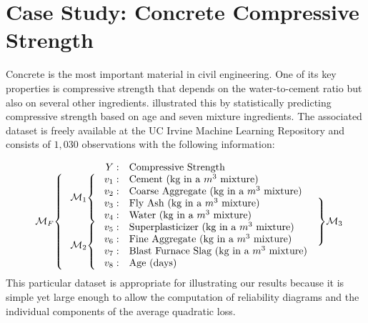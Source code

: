 \documentclass[11pt]{article}
\theoremstyle{definition}
\theoremstyle{definition}
\begin{document}
\section{Case Study: Concrete Compressive Strength} \label{application}

Concrete is the most important material in civil engineering. One of its key properties is compressive strength that depends on the water-to-cement ratio but also on several other ingredients. \cite{yeh1998modeling} illustrated this by statistically predicting compressive strength based on age and seven mixture ingredients. The associated dataset is freely available at the UC Irvine Machine Learning Repository \citep{Lichman:2013} and consists of $1,030$ observations with the following information:

\begin{equation}
\begin{array}{ll r lr}
&&Y: & \text{Compressive Strength}&\\
\ldelim\{{8}{2.5em}[$\mathcal{M}_F$] &\ldelim\{{4}{2.5em}[$\mathcal{M}_1$] &v_1: &  \text{Cement (kg in a $m^3$ mixture)}&  \\
&&v_2: & \text{Coarse Aggregate (kg in a $m^3$ mixture)}&\\
  &&v_3: &  \text{Fly Ash (kg in a $m^3$ mixture)}&  \rdelim\}{4}{2em}[$\mathcal{M}_3$] \\
&&v_4: & \text{Water (kg in a $m^3$ mixture)}&\\
&\ldelim\{{4}{2.5em}[$\mathcal{M}_2$] &v_5: &  \text{Superplasticizer (kg in a $m^3$ mixture)}&  \\
&&v_6: & \text{Fine Aggregate  (kg in a $m^3$ mixture)}&\\
&&v_7: & \text{Blast Furnace Slag (kg in a $m^3$ mixture)}&\\
&&v_8: & \text{Age (days)}&
\end{array}\label{realData}
\end{equation}
\noindent
This particular dataset is appropriate for illustrating our results because it is simple yet large enough to allow the computation of reliability diagrams and the individual components of the average quadratic loss.
\end{document}
